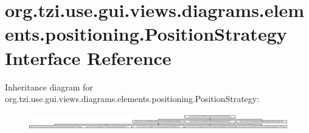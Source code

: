 \hypertarget{interfaceorg_1_1tzi_1_1use_1_1gui_1_1views_1_1diagrams_1_1elements_1_1positioning_1_1_position_strategy}{\section{org.\-tzi.\-use.\-gui.\-views.\-diagrams.\-elements.\-positioning.\-Position\-Strategy Interface Reference}
\label{interfaceorg_1_1tzi_1_1use_1_1gui_1_1views_1_1diagrams_1_1elements_1_1positioning_1_1_position_strategy}
}
Inheritance diagram for org.\-tzi.\-use.\-gui.\-views.\-diagrams.\-elements.\-positioning.\-Position\-Strategy\-:\begin{figure}[H]
\begin{center}
\leavevmode
\includegraphics[height=0.708861cm]{interfaceorg_1_1tzi_1_1use_1_1gui_1_1views_1_1diagrams_1_1elements_1_1positioning_1_1_position_strategy}
\end{center}
\end{figure}
